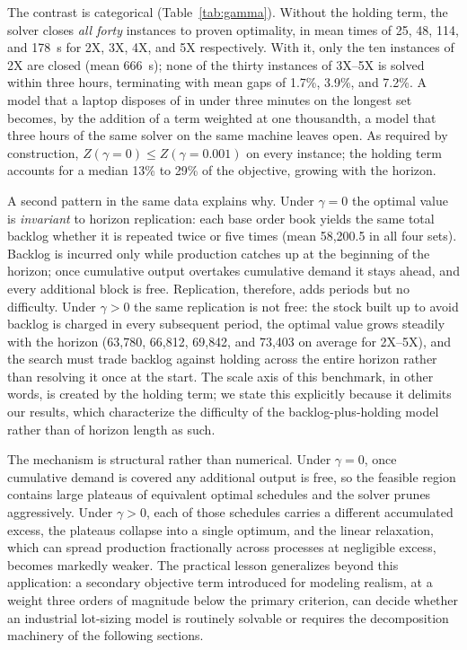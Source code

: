 

The contrast is categorical (Table~\ref{tab:gamma}). Without the
holding term, the solver closes \emph{all forty} instances to proven
optimality, in mean times of 25, 48, 114, and 178~s for 2X, 3X, 4X,
and 5X respectively. With it, only the ten instances of 2X are closed
(mean 666~s); none of the thirty instances of 3X--5X is solved within
three hours, terminating with mean gaps of 1.7\%, 3.9\%, and 7.2\%.
A model that a laptop disposes of in under three minutes on the
longest set becomes, by the addition of a term weighted at one
thousandth, a model that three hours of the same solver on the same
machine leaves open. As required by construction,
$Z(\gamma=0)\le Z(\gamma=0.001)$ on every instance; the holding term
accounts for a median 13\% to 29\% of the objective, growing with the
horizon.

A second pattern in the same data explains why. Under $\gamma=0$ the
optimal value is \emph{invariant} to horizon replication: each base
order book yields the same total backlog whether it is repeated twice
or five times (mean 58{,}200.5 in all four sets). Backlog is incurred
only while production catches up at the beginning of the horizon; once
cumulative output overtakes cumulative demand it stays ahead, and
every additional block is free. Replication, therefore, adds periods
but no difficulty. Under $\gamma>0$ the same replication is not free:
the stock built up to avoid backlog is charged in every subsequent
period, the optimal value grows steadily with the horizon (63{,}780,
66{,}812, 69{,}842, and 73{,}403 on average for 2X--5X), and the
search must trade backlog against holding across the entire horizon
rather than resolving it once at the start. The scale axis of this
benchmark, in other words, is created by the holding term; we state
this explicitly because it delimits our results, which characterize
the difficulty of the backlog-plus-holding model rather than of
horizon length as such.

The mechanism is structural rather than numerical. Under
$\gamma=0$, once cumulative demand is covered any additional output is
free, so the feasible region contains large plateaus of equivalent
optimal schedules and the solver prunes aggressively. Under
$\gamma>0$, each of those schedules carries a different accumulated
excess, the plateaus collapse into a single optimum, and the linear
relaxation, which can spread production fractionally across
processes at negligible excess, becomes markedly weaker. The
practical lesson generalizes beyond this application: a secondary
objective term introduced for modeling realism, at a weight three
orders of magnitude below the primary criterion, can decide whether an
industrial lot-sizing model is routinely solvable or requires the
decomposition machinery of the following sections.

